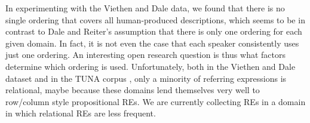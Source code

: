 In experimenting with the Viethen and Dale data, we found that
there is no single ordering that covers all human-produced
descriptions, which seems to be in contrast to Dale and Reiter's
 assumption that there is only one ordering for
each given domain.  In fact, it is not even the case that each speaker
consistently uses just one ordering.  An interesting open research
question is thus what factors determine which ordering is used.
Unfortunately, both in the Viethen and Dale dataset and in the TUNA
corpus \cite{deemter06:_build_seman_trans_corpus_for}, only a minority
of referring expressions is relational, maybe because these domains
lend themselves very well to row/column style propositional REs.  We
are currently collecting REs in a domain in
which relational REs are less frequent.



